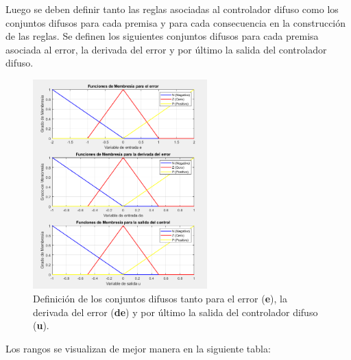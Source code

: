 \begin{enumerate}
    Luego se deben definir tanto las reglas asociadas al controlador difuso como los conjuntos difusos para cada premisa y para cada consecuencia en la construcción de las reglas. Se definen los siguientes conjuntos difusos para cada premisa asociada al error, la derivada del error y por último la salida del controlador difuso.
    
    \begin{figure}
        \centering
        \includegraphics[width=0.6\textwidth]{img/Figure_6}
        \caption{Definición de los conjuntos difusos tanto para el error (\textbf{e}), la derivada del error (\textbf{de}) y por último la salida del controlador difuso (\textbf{u}).}
        \label{fig:7}
    \end{figure}
    
    Los rangos se visualizan de mejor manera en la siguiente tabla:
    

\end{enumerate}
